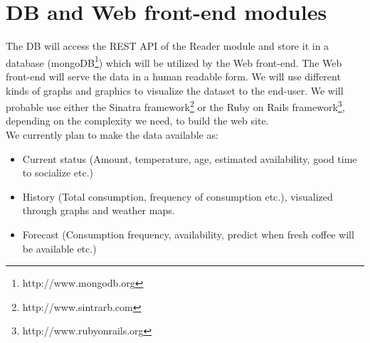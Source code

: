 \documentclass[a4paper]{article}
\begin{document}
\section{DB and Web front-end modules}
The DB will access the REST API of the Reader module and store it in a database (mongoDB\footnote{http://www.mongodb.org}) which will be utilized by the Web front-end. The Web front-end will serve
the data in a human readable form. We will use different kinds of graphs and graphics to visualize the dataset to the end-user. We will probable use either the Sinatra framework\footnote{http://www.sintrarb.com}
or the Ruby on Rails framework\footnote{http://www.rubyonrails.org}, depending on the complexity we need, to build the web site.\\

We currently plan to make the data available as:
\begin{itemize}
\item Current status (Amount, temperature, age, estimated availability, good time to socialize etc.)
\item History (Total consumption, frequency of consumption etc.), visualized through graphs and weather maps.
\item Forecast (Consumption frequency, availability, predict when fresh coffee will be available etc.) 
\end{itemize}
\end{document}
